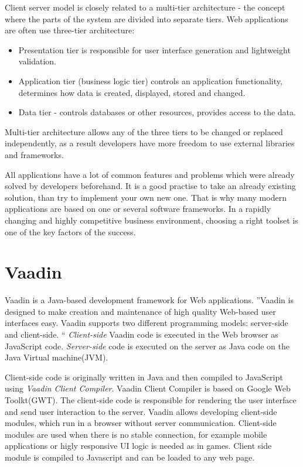     	Client server model is closely related to a multi-tier architecture - the
    	concept where the parts of the system are divided into separate tiers. Web applications
    	 are often use three-tier architecture:
    	 \begin{itemize}
    	   \item Presentation tier is responsible for user interface generation and
    	   lightweight validation.
    	   \item Application tier (business logic tier) controls an application
    	   functionality, determines how data is created, displayed, stored and
    	   changed.
    	   \item Data tier - controls databases or other resources, provides access
    	   to the data.
    	 \end{itemize}
    	Multi-tier architecture allows any of the three tiers to be changed or
    	replaced independently, as a result developers have more freedom to use
    	external libraries and frameworks.
		
		All	applications have a lot of common features and problems which were already
		solved by developers beforehand. It is a good practise to take an already
		existing solution, than try to implement your own new one. That is why many
		modern applications are based on one or several software frameworks. In a
		rapidly changing and highly competitive business environment, choosing a right toolset is one of
		the key factors of the success.	 	
		
  \section{Vaadin}
  \label{ch:vaadin}
    Vaadin is a Java-based development framework for Web applications. ''Vaadin
    is designed to make creation and maintenance of high quality Web-based user interfaces easy.
   Vaadin supports two different programming models: server-side and client-side. 
   `` \cite[pr1.1]{bookVaaidn}
   \emph{Client-side} Vaadin code is executed in the Web browser as JavaScript
   code.
   \emph{Server-side} code is executed on the server as Java code on the Java
   Virtual machine(JVM).

   Client-side code is originally written in Java and then
   compiled to JavaScript using \emph{Vaadin Client Compiler}. Vaadin Client Compiler is based on Google
   Web Toolkt(GWT). The client-side code is responsible for rendering
   the user interface and send user interaction to the server. Vaadin allows
   developing client-side modules, which run in a browser without server
   communication. Client-side modules are used when there is no stable
   connection, for example mobile applications or  higly responsive UI logic is
   needed as in games. Client side module is compiled to Javascript and can be
   loaded to any web page.
   
